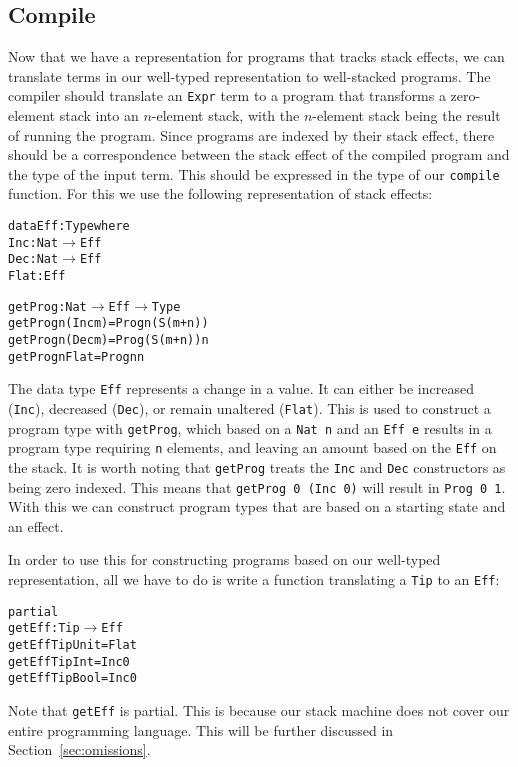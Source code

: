 \subsection{Compile}
Now that we have a representation for programs that tracks stack effects, we can translate terms in our well-typed representation to well-stacked programs. The compiler should translate an \texttt{Expr} term to a program that transforms a zero-element stack into an $n$-element stack, with the $n$-element stack being the result of running the program. Since programs are indexed by their stack effect, there should be a correspondence between the stack effect of the compiled program and the type of the input term. This should be expressed in the type of our \texttt{compile} function. For this we use the following representation of stack effects:

\begin{alltt}
data Eff : Type where
	Inc  : Nat \(\rightarrow\) Eff
	Dec  : Nat \(\rightarrow\) Eff
	Flat :         Eff

getProg : Nat \(\rightarrow\) Eff \(\rightarrow\) Type
getProg n (Inc m) = Prog n (S (m + n))
getProg n (Dec m) = Prog (S (m + n)) n
getProg n Flat    = Prog n n
\end{alltt}

The data type \texttt{Eff} represents a change in a value. It can either be increased (\texttt{Inc}), decreased (\texttt{Dec}), or remain unaltered (\texttt{Flat}). This is used to construct a program type with \texttt{getProg}, which based on a \texttt{Nat n} and an \texttt{Eff e} results in a program type requiring \texttt{n} elements, and leaving an amount based on the \texttt{Eff} on the stack. It is worth noting that \texttt{getProg} treats the \texttt{Inc} and \texttt{Dec} constructors as being zero indexed. This means that \texttt{getProg 0 (Inc 0)} will result in \texttt{Prog 0 1}. With this we can construct program types that are based on a starting state and an effect.

In order to use this for constructing programs based on our well-typed representation, all we have to do is write a function translating a \texttt{Tip} to an \texttt{Eff}:

\begin{alltt}
partial
getEff : Tip \(\rightarrow\) Eff
getEff TipUnit = Flat
getEff TipInt  = Inc 0
getEff TipBool = Inc 0
\end{alltt}

Note that \texttt{getEff} is partial. This is because our stack machine does not cover our entire programming language. This will be further discussed in Section~\ref{sec:omissions}.

